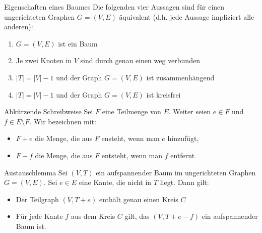 \documentclass{panikzettel}
\newcommand{\boxspace}{	\vspace{-\baselineskip}	}
\begin{document}
{\begin{theo}{Eigenschaften eines Baumes}
	Die folgenden vier Aussagen sind für einen ungerichteten Graphen $G= (V,E)$ äquivalent (d.h. jede Aussage impliziert alle anderen):

	\begin{enumerate}
		\item $G=(V,E)$ ist ein Baum
		\item Je zwei Knoten in $V$ sind durch genau einen weg verbunden
		\item $|T| = |V| - 1$ und der Graph $G = (V,E)$ ist zusammenhängend
		\item $|T| = |V| - 1$ und der Graph $G = (V,E)$ ist kreisfrei
	\end{enumerate}
\end{theo}

\begin{halfboxl}
	\boxspace
	
	\begin{defi}{Abkürzende Schreibweise}
		Sei $F$ eine Teilmenge von $E$. Weiter seien $e \in F$ und $f \in E\setminus F$. Wir bezeichnen mit:
		
		\begin{itemize}
			\item $F + e$ die Menge, die aus $F$ ensteht, wenn man $e$ hinzufügt,
			\item $F -f$ die Menge, die aus $F$ entsteht, wenn man $f$ entfernt
		\end{itemize}
		
	\end{defi}
	
\end{halfboxl}%
\begin{halfboxr}
	\boxspace
	
	\begin{defi}{Austauschlemma}
		Sei $(V,T)$ ein aufspannender Baum im ungerichteten Graphen $G = (V,E)$. Sei $e \in E$ eine Kante, die nicht in $T$ liegt. Dann gilt:
		
		\begin{itemize}
			\item Der Teilgraph $(V,T+e)$ enthält genau einen Kreis $C$
			\item Für jede Kante $f$ aus dem Kreis $C$ gilt, das $(V,T+e-f)$ ein aufspannender Baum ist.
		\end{itemize}
	\end{defi}
	
\end{halfboxr}

}
\end{document}
